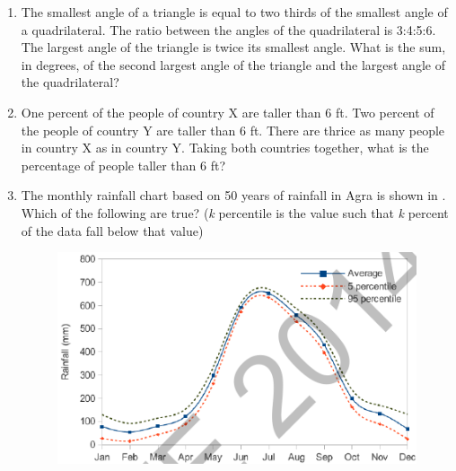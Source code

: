 \documentclass[journal,12pt,onecolumn]{IEEEtran}
\theoremstyle{remark}
\begin{document}
\begin{enumerate}
\item The smallest angle of a triangle is equal to two thirds of the smallest angle of a quadrilateral. The ratio between the angles of the quadrilateral is 3:4:5:6. The largest angle of the triangle is twice its smallest angle. What is the sum, in degrees, of the second largest angle of the triangle and the largest angle of the quadrilateral?

\item One percent of the people of country X are taller than 6 ft. Two percent of the people of country Y are taller than 6 ft. There are thrice as many people in country X as in country Y. Taking both countries together, what is the percentage of people taller than 6 ft?
\hfill{} \begin{enumerate}  \end{enumerate}

\item The monthly rainfall chart based on 50 years of rainfall in Agra is shown in .
Which of the following are true? (\textit{k} percentile is the value such that \textit{k} percent of the data fall below that value)
\begin{figure}[H]
\centering
 \caption{} \label{fig:10} \includegraphics[width=0.8\columnwidth]{figs/q10.png}
\end{figure}


\end{enumerate}
\end{document}
